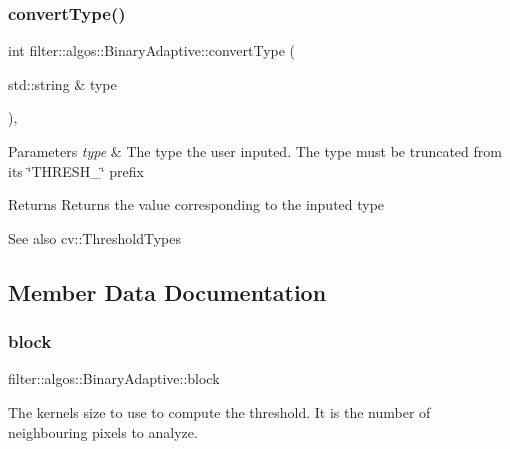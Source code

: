 \subsubsection{\texorpdfstring{convert\+Type()}{convertType()}}
{\footnotesize\ttfamily int filter\+::algos\+::\+Binary\+Adaptive\+::convert\+Type (\begin{DoxyParamCaption}\item[{std\+::string \&}]{type }\end{DoxyParamCaption})\hspace{0.3cm}{\ttfamily [inline]}, {\ttfamily [private]}}


\begin{DoxyParams}{Parameters}
{\em type} & The type the user inputed. The type must be truncated from its \char`\"{}\+T\+H\+R\+E\+S\+H\+\_\+\char`\"{} prefix \\
\hline
\end{DoxyParams}
\begin{DoxyReturn}{Returns}
Returns the value corresponding to the inputed type 
\end{DoxyReturn}
\begin{DoxySeeAlso}{See also}
cv\+::\+Threshold\+Types 
\end{DoxySeeAlso}


\subsection{Member Data Documentation}
\mbox{\label{classfilter_1_1algos_1_1_binary_adaptive_ad36a47f5f1a5cc2b78f17ab842e31487}} 
\subsubsection{\texorpdfstring{block}{block}}
{\footnotesize\ttfamily filter\+::algos\+::\+Binary\+Adaptive\+::block}

The kernel\textquotesingle{}s size to use to compute the threshold. It is the number of neighbouring pixels to analyze. \mbox{\label{classfilter_1_1algos_1_1_binary_adaptive_acce86b4d7f1370bc36cd283dcc26970c}} 
